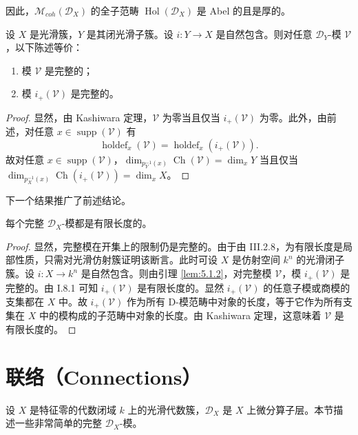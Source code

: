 因此，$\mathcal{M}_{coh}(\mathcal{D}_X)$ 的全子范畴 $\operatorname{Hol}(\mathcal{D}_X)$ 是 Abel 的且是厚的。

\begin{lemma}\label{lem:5.1.2}
设 $X$ 是光滑簇，$Y$ 是其闭光滑子簇。设 $i:Y\to X$ 是自然包含。则对任意 $\mathcal{D}_Y$-模 $\mathcal{V}$，以下陈述等价：
\begin{enumerate}[label=(\roman*)]
  \item 模 $\mathcal{V}$ 是完整的；
  \item 模 $i_+(\mathcal{V})$ 是完整的。
\end{enumerate}
\end{lemma}

\begin{proof}
显然，由 Kashiwara 定理，$\mathcal{V}$ 为零当且仅当 $i_+(\mathcal{V})$ 为零。此外，由前述，对任意 $x\in\operatorname{supp}(\mathcal{V})$ 有
$$\operatorname{holdef}_x(\mathcal{V})=\operatorname{holdef}_x(i_+(\mathcal{V})).$$
故对任意 $x\in\operatorname{supp}(\mathcal{V})$，$\dim_{p_Y^{-1}(x)}\operatorname{Ch}(\mathcal{V})=\dim_xY$ 当且仅当
$\dim_{p_X^{-1}(x)}\operatorname{Ch}(i_+(\mathcal{V}))=\dim_xX$。
\end{proof}

下一个结果推广了前述结论。

\begin{theorem}\label{thm:5.1.3}
每个完整 $\mathcal{D}_X$-模都是有限长度的。
\end{theorem}

\begin{proof}
显然，完整模在开集上的限制仍是完整的。由于由 III.2.8，为有限长度是局部性质，只需对光滑仿射簇证明该断言。此时可设 $X$ 是仿射空间 $k^n$ 的光滑闭子簇。设 $i:X\to k^n$ 是自然包含。则由引理 \ref{lem:5.1.2}，对完整模 $\mathcal{V}$，模 $i_+(\mathcal{V})$ 是完整的。由 I.8.1 可知 $i_+(\mathcal{V})$ 是有限长度的。显然 $i_+(\mathcal{V})$ 的任意子模或商模的支集都在 $X$ 中。故 $i_+(\mathcal{V})$ 作为所有 D-模范畴中对象的长度，等于它作为所有支集在 $X$ 中的模构成的子范畴中对象的长度。由 Kashiwara 定理，这意味着 $\mathcal{V}$ 是有限长度的。
\end{proof}

\section{联络（Connections）}

设 $X$ 是特征零的代数闭域 $k$ 上的光滑代数簇，$\mathcal{D}_X$ 是 $X$ 上微分算子层。本节描述一些非常简单的完整 $\mathcal{D}_X$-模。

